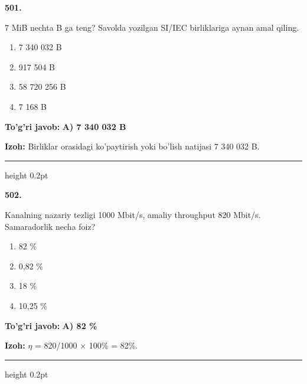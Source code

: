 \documentclass[10pt,a4paper,oneside]{article}
\begin{document}
\noindent\textbf{\color{ink}501.}
\par
7 MiB nechta B ga teng? Savolda yozilgan SI/IEC birliklariga aynan amal qiling.
\begin{enumerate}[label=\Alph*),leftmargin=9mm]
\item 7 340 032 B
\item 917 504 B
\item 58 720 256 B
\item 7 168 B
\end{enumerate}
\begin{tcolorbox}[enhanced,breakable,colback=teal!4,colframe=teal!50!black,boxrule=0.5pt,arc=1.1mm,left=3mm,right=3mm,top=1.7mm,bottom=1.7mm,before skip=2mm,after skip=2mm]
\textbf{\color{teal}To'g'ri javob:} \textbf{A) 7 340 032 B}
\par\smallskip
\textbf{Izoh:} Birliklar orasidagi ko'paytirish yoki bo'lish natijasi 7 340 032 B.
\end{tcolorbox}
\vspace{2mm}\hrule height 0.2pt \vspace{3mm}

\noindent\textbf{\color{ink}502.}
\par
Kanalning nazariy tezligi 1000 Mbit/s, amaliy throughput 820 Mbit/s. Samaradorlik necha foiz?
\begin{enumerate}[label=\Alph*),leftmargin=9mm]
\item 82 \%
\item 0,82 \%
\item 18 \%
\item 10,25 \%
\end{enumerate}
\begin{tcolorbox}[enhanced,breakable,colback=teal!4,colframe=teal!50!black,boxrule=0.5pt,arc=1.1mm,left=3mm,right=3mm,top=1.7mm,bottom=1.7mm,before skip=2mm,after skip=2mm]
\textbf{\color{teal}To'g'ri javob:} \textbf{A) 82 \%}
\par\smallskip
\textbf{Izoh:} \ensuremath{\eta} = 820/1000 \ensuremath{\times} 100\% = 82\%.
\end{tcolorbox}
\vspace{2mm}\hrule height 0.2pt \vspace{3mm}
\end{document}
